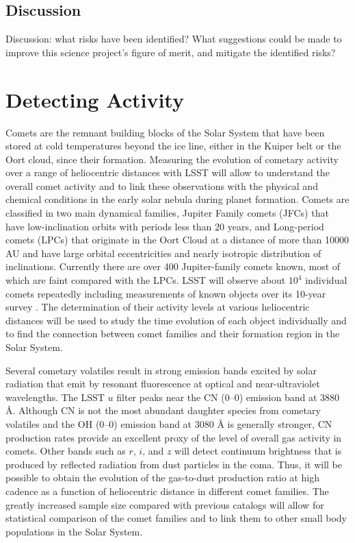 
\subsection{Discussion}
\label{sec:\secname:discussion}

Discussion: what risks have been identified? What suggestions could be
made to improve this science project's figure of merit, and mitigate
the identified risks?



\section{Detecting Activity}
\def\secname{\chpname:activity}\label{sec:\secname}


Comets are the remnant building blocks of the Solar System
that have been stored at cold temperatures beyond the ice
line, either in the Kuiper belt or the Oort cloud, since their
formation.  Measuring the evolution of cometary activity over
a range of heliocentric distances with LSST will allow to
understand the overall comet activity and to link these
observations with the physical and chemical conditions in the
early solar nebula during planet formation.  Comets are
classified in two main dynamical families, Jupiter Family
comets (JFCs) that have low-inclination orbits with periods
less than 20 years, and Long-period comets (LPCs) that
originate in the Oort Cloud at a distance of more than 10000
AU and have large orbital eccentricities and nearly isotropic
distribution of inclinations.  Currently there are over 400
Jupiter-family comets known, most of which are faint compared
with the LPCs.  LSST will observe about $10^4$ individual
comets repeatedly including measurements of known objects over
its 10-year survey \citep{2010PhDT.......241S}. The
determination of their activity levels at various heliocentric
distances will be used to study the time evolution of each
object individually and to find the connection between comet
families and their formation region in the Solar System.

Several cometary volatiles result in strong emission bands
excited by solar radiation that emit by resonant fluorescence
at optical and near-ultraviolet wavelengths.  The LSST $u$
filter peaks near the CN (0--0) emission band at 3880 \r{A}.
Although CN is not the most abundant daughter species from
cometary volatiles and the OH (0--0) emission band at 3080
\r{A} is generally stronger, CN production rates provide an
excellent proxy of the level of overall gas activity in
comets. Other bands such as $r$, $i$, and $z$ will detect
continuum brightness that is produced by reflected radiation
from dust particles in the coma. Thus, it will be possible to
obtain the evolution of the gas-to-dust production ratio at
high cadence as a function of heliocentric distance in
different comet families. The greatly increased sample size
compared with previous catalogs \citep{1995Icar..118..223A}
will allow for statistical comparison of the comet families
and to link them to other small body populations in the Solar
System.

